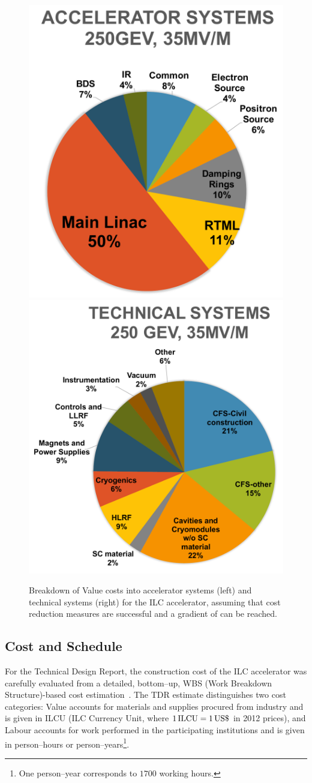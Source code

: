 
\begin{figure}[htbp]
 \begin{center}
 \includegraphics[width=0.36\hsize]{chapters/figures/costs-as.pdf}
 \includegraphics[width=0.4\hsize]{chapters/figures/costs-ts.pdf}
\caption{Breakdown of Value costs into accelerator systems (left) and technical systems (right) for the  ILC accelerator, assuming that cost reduction measures are successful and a gradient of  can be reached.
\label{fig:costs}}
 \end{center}
 \end{figure}


\subsection{Cost and Schedule}


%

For the Technical Design Report, the construction cost of the ILC accelerator was carefully evaluated from a detailed, bottom--up, WBS (Work Breakdown Structure)-based cost estimation~\cite[Sect. 15]{Adolphsen:2013kya}.
The TDR estimate distinguishes two cost categories: Value accounts for materials and supplies procured from industry and is given in ILCU (ILC Currency Unit, where $1\,{\mathrm{ILCU}} = 1\,{\mathrm{US\$}}$ in 2012 prices), and Labour accounts for work performed in the participating institutions and is given in person--hours or person--years\footnote{One person--year corresponds to $1700$ working hours.}.


